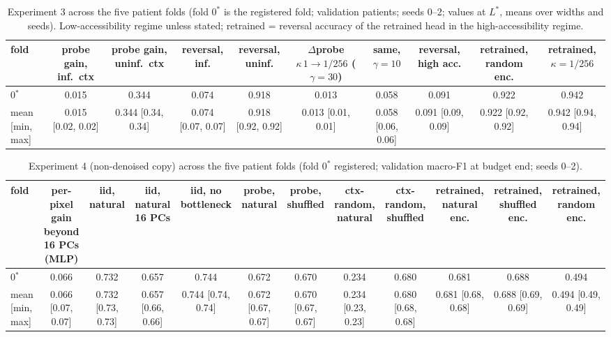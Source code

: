 \begin{table}[htbp]\centering\scriptsize
\caption{Experiment 3 across the five patient folds (fold $0^\ast$ is the registered fold; validation patients; seeds 0--2; values at $L^\ast$, means over widths and seeds). Low-accessibility regime unless stated; retrained = reversal accuracy of the retrained head in the high-accessibility regime.}\label{tab:exp3_folds}
\begin{tabular}{lccccccccc}\toprule
fold & probe gain, inf.\ ctx & probe gain, uninf.\ ctx & reversal, inf. & reversal, uninf. & $\Delta$probe $\kappa\,1\to1/256$ ($\gamma=30$) & same, $\gamma=10$ & reversal, high acc. & retrained, random enc. & retrained, $\kappa=1/256$ \\ \midrule
0$^\ast$ & 0.015 & 0.344 & 0.074 & 0.918 & 0.013 & 0.058 & 0.091 & 0.922 & 0.942 \\
\midrule mean [min, max] & 0.015 [0.02, 0.02] & 0.344 [0.34, 0.34] & 0.074 [0.07, 0.07] & 0.918 [0.92, 0.92] & 0.013 [0.01, 0.01] & 0.058 [0.06, 0.06] & 0.091 [0.09, 0.09] & 0.922 [0.92, 0.92] & 0.942 [0.94, 0.94] \\
\bottomrule\end{tabular}\end{table}
\begin{table}[htbp]\centering\scriptsize
\caption{Experiment 4 (non-denoised copy) across the five patient folds (fold $0^\ast$ registered; validation macro-F1 at budget end; seeds 0--2).}\label{tab:exp4_folds}
\begin{tabular}{lccccccccccc}\toprule
fold & per-pixel gain beyond 16 PCs (MLP) & iid, natural & iid, natural 16 PCs & iid, no bottleneck & probe, natural & probe, shuffled & ctx-random, natural & ctx-random, shuffled & retrained, natural enc. & retrained, shuffled enc. & retrained, random enc. \\ \midrule
0$^\ast$ & 0.066 & 0.732 & 0.657 & 0.744 & 0.672 & 0.670 & 0.234 & 0.680 & 0.681 & 0.688 & 0.494 \\
\midrule mean [min, max] & 0.066 [0.07, 0.07] & 0.732 [0.73, 0.73] & 0.657 [0.66, 0.66] & 0.744 [0.74, 0.74] & 0.672 [0.67, 0.67] & 0.670 [0.67, 0.67] & 0.234 [0.23, 0.23] & 0.680 [0.68, 0.68] & 0.681 [0.68, 0.68] & 0.688 [0.69, 0.69] & 0.494 [0.49, 0.49] \\
\bottomrule\end{tabular}\end{table}
